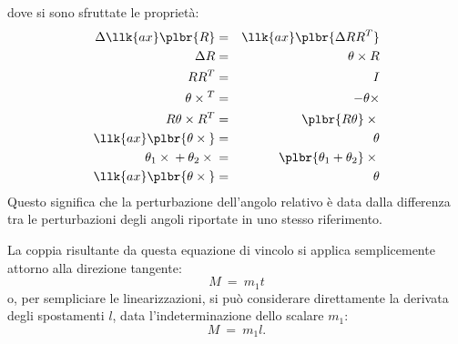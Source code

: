 \documentclass[12pt,dvips,fleqn,italian]{article}
\begin{document}
dove si sono sfruttate le propriet\`a:
\begin{eqnarray*}
	\Delta\llk{ax}\plbr{R} & = & \llk{ax}\plbr{\Delta{R} R^T} \\
	\Delta{R} & = & \theta\times{R} \\
	R R^T & = & I \\
	\theta\times{}^T & = & -\theta\times \\
	R \theta\times{R^T} & = & \plbr{R\theta}\times{} \\
	\llk{ax}\plbr{\theta\times{}} & = & \theta \\
	\theta_1\times{}+\theta_2\times{} & = & \plbr{\theta_1+\theta_2}\times{} \\
	\llk{ax}\plbr{\theta\times{}} & = & \theta
\end{eqnarray*}
Questo significa che la perturbazione dell'angolo relativo \`e data 
dalla differenza tra le perturbazioni degli angoli riportate in uno 
stesso riferimento.

\noindent
La coppia risultante da questa equazione di vincolo si applica semplicemente
attorno alla direzione tangente:
\begin{displaymath}
	M \ = \ m_1 t
\end{displaymath}
o, per sempliciare le linearizzazioni, si pu\`o considerare direttamente
la derivata degli spostamenti $l$, data l'indeterminazione dello scalare
$m_1$:
\begin{displaymath}
	M \ = \ m_1 l .
\end{displaymath}
\end{document}
